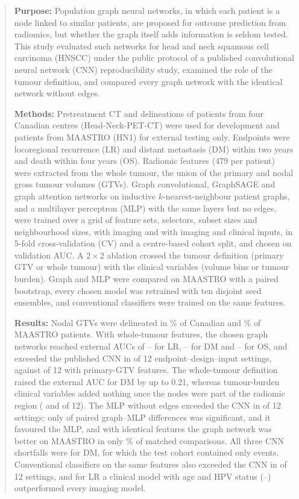 \documentclass[11pt,a4paper]{article}
\begin{document}
\begin{abstract}
\noindent \textbf{Purpose:} Population graph neural networks, in which each patient is a node linked to similar patients, are proposed for outcome prediction from radiomics, but whether the graph itself adds information is seldom tested. This study evaluated such networks for head and neck squamous cell carcinoma (HNSCC) under the public protocol of a published convolutional neural network (CNN) reproducibility study, examined the role of the tumour definition, and compared every graph network with the identical network without edges.

\noindent \textbf{Methods:} Pretreatment CT and delineations of \nPatCan{} patients from four Canadian centres (Head-Neck-PET-CT) were used for development and \nPatMAA{} patients from MAASTRO (HN1) for external testing only. Endpoints were locoregional recurrence (LR) and distant metastasis (DM) within two years and death within four years (OS). Radiomic features (479 per patient) were extracted from the whole tumour, the union of the primary and nodal gross tumour volumes (GTVs). Graph convolutional, GraphSAGE and graph attention networks on inductive $k$-nearest-neighbour patient graphs, and a multilayer perceptron (MLP) with the same layers but no edges, were trained over a grid of feature sets, selectors, subset sizes and neighbourhood sizes, with imaging and with imaging and clinical inputs, in 5-fold cross-validation (CV) and a centre-based cohort split, and chosen on validation AUC. A $2\times2$ ablation crossed the tumour definition (primary GTV or whole tumour) with the clinical variables (volume bins or tumour burden). Graph and MLP were compared on MAASTRO with a paired bootstrap, every chosen model was retrained with ten disjoint seed ensembles, and conventional classifiers were trained on the same features.

\noindent \textbf{Results:} Nodal GTVs were delineated in \nodalPctCan\% of Canadian and \nodalPctMAA\% of MAASTRO patients. With whole-tumour features, the chosen graph networks reached external AUCs of \mainLRMin--\mainLRMax{} for LR, \mainDMMin--\mainDMMax{} for DM and \mainOSMin--\mainOSMax{} for OS, and exceeded the published CNN in \winsGraph{} of 12 endpoint--design--input settings, against \winsPrimVol{} of 12 with primary-GTV features. The whole-tumour definition raised the external AUC for DM by up to 0.21, whereas tumour-burden clinical variables added nothing once the nodes were part of the radiomic region (\winsTotVol{} and \winsTotBur{} of 12). The MLP without edges exceeded the CNN in \winsMLP{} of 12 settings; only \pairedNsig{} of \pairedN{} paired graph--MLP differences was significant, and it favoured the MLP, and with identical features the graph network was better on MAASTRO in only \matchedTestFracAll\% of \matchedN{} matched comparisons. All three CNN shortfalls were for DM, for which the test cohort contained only \eTestDM{} events. Conventional classifiers on the same features also exceeded the CNN in \winsCls{} of 12 settings, and for LR a clinical model with age and HPV status (\clsClinLRMin--\clsClinLRMax) outperformed every imaging model.


\end{abstract}
\end{document}
